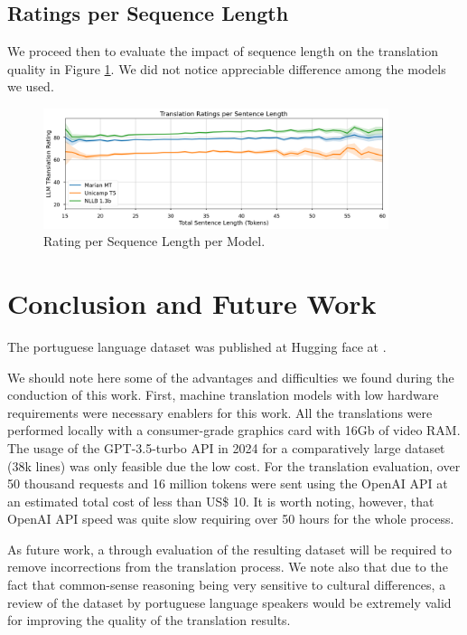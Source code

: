 \documentclass{article}
\begin{document}
\subsection{Ratings per Sequence Length}

We proceed then to evaluate the impact of sequence length on the translation
quality in Figure \ref{fig:line-chart}. We did not notice appreciable difference
among the models we used.

\begin{figure}[htpb]
    \centering
    \includegraphics[width=0.9\textwidth]{figures/line-chart.png}
    \caption{\label{fig:line-chart}Rating per Sequence Length per Model.}
\end{figure}

\section{Conclusion and Future Work}

The portuguese language dataset was published at Hugging face at \cite{socialiqa_pt}. 

We should note here some of the advantages and difficulties we found during the
conduction of this work. First, machine translation models with low hardware
requirements were necessary enablers for this work. All the translations were
performed locally with a consumer-grade graphics card with 16Gb of video RAM.
The usage of the GPT-3.5-turbo API in 2024 for a comparatively large dataset
(38k lines) was only feasible due the low cost. For the translation evaluation,
over 50 thousand requests and 16 million tokens were sent using the OpenAI API
at an estimated total cost of less than US\$ 10. It is worth noting, however,
that OpenAI API speed was quite slow requiring over 50 hours for the whole
process.

As future work, a through evaluation of the resulting dataset will be required
to remove incorrections from the translation process. We note also that due to
the fact that common-sense reasoning being very sensitive to cultural
differences, a review of the dataset by portuguese language speakers would be
extremely valid for improving the quality of the translation results.



\end{document}

